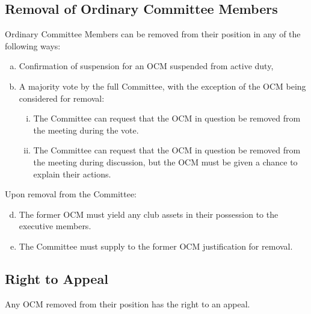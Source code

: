 \documentclass[a4paper,12pt]{article}
\begin{document}
\subsection{Removal of Ordinary Committee Members}

Ordinary Committee Members can be removed from their position in any of the following ways:

\begin{enumerate}[a)]
	\item Confirmation of suspension for an OCM suspended from active duty,
	\item A majority vote by the full Committee, with the exception of the OCM being considered for removal:
	\begin{enumerate}[i)]
		\item The Committee can request that the OCM in question be removed from the meeting during the vote.
		\item The Committee can request that the OCM in question be removed from the meeting during discussion, but the OCM must be given a chance to explain their actions.
	\end{enumerate}
\end{enumerate}

Upon removal from the Committee:

\begin{enumerate}[a)]
	\setcounter{enumi}{3}
	\item The former OCM must yield any club assets in their possession to the executive members.
	\item The Committee must supply to the former OCM justification for removal.
\end{enumerate}

\subsection{Right to Appeal}

Any OCM removed from their position has the right to an appeal.
\end{document}
